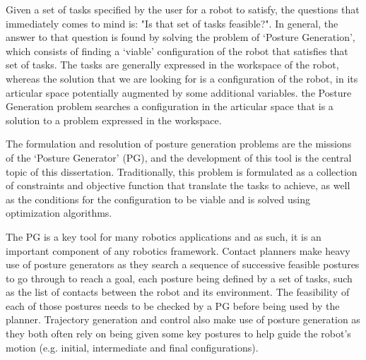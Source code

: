 Given a set of tasks specified by the user for a robot to satisfy, the questions that immediately comes to mind is: "Is that set of tasks feasible?".
In general, the answer to that question is found by solving the problem of `Posture Generation', which consists of finding a `viable' configuration of the robot that satisfies that set of tasks.
The tasks are generally expressed in the workspace of the robot, whereas the solution that we are looking for is a configuration of the robot, in its articular space potentially augmented by some additional variables. %
the Posture Generation problem searches a configuration in the articular space that is a solution to a problem expressed in the workspace.

The formulation and resolution of posture generation problems are the missions of the `Posture Generator' (PG), and the development of this tool is the central topic of this dissertation.
Traditionally, this problem is formulated as a collection of constraints and objective function that translate the tasks to achieve, as well as the conditions for the configuration to be viable and is solved using optimization algorithms.

The PG is a key tool for many robotics applications and as such, it is an important component of any robotics framework.
Contact planners make heavy use of posture generators as they search a sequence of successive feasible postures to go through to reach a goal, each posture being defined by a set of tasks, such as the list of contacts between the robot and its environment.
The feasibility of each of those postures needs to be checked by a PG before being used by the planner.
Trajectory generation and control also make use of posture generation as they both often rely on being given some key postures to help guide the robot's motion (e.g. initial, intermediate and final configurations).


